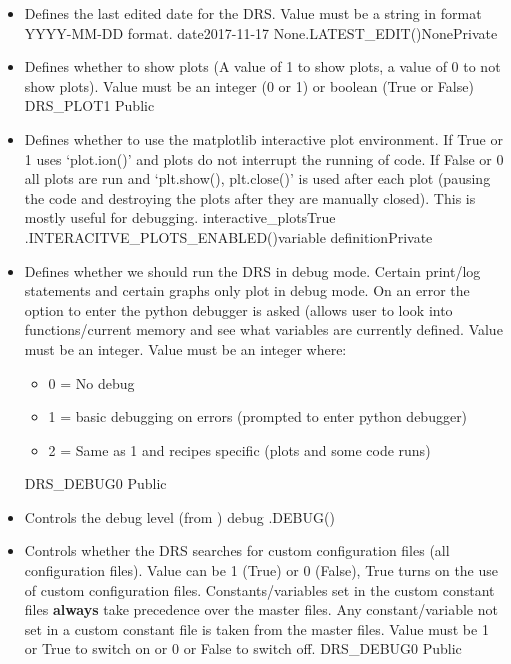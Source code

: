 \begin{itemize}
\ifdevguide
\item {}
{Defines the last edited date for the DRS. Value must be a string in format YYYY-MM-DD format.}
{date}{2017-11-17}
{None}{\spirouConst.LATEST\_EDIT()}{None}{Private}
\fi


\item {} 
{Defines whether to show plots (A value of 1 to show plots, a value of 0 to not show plots). Value must be an integer (0 or 1) or boolean (True or False)}
{DRS\_PLOT}{1}
{\AllRecipes}{\configtxtfile}{\AllRecipes}{Public}

\ifdevguide
\item {}
{Defines whether to use the matplotlib interactive plot environment. If True or 1 uses `plot.ion()' and plots do not interrupt the running of code. If False or 0 all plots are run and `plt.show(), plt.close()' is used after each plot (pausing the code and destroying the plots after they are manually closed). This is mostly useful for debugging.}
{interactive\_plots}{True}
{\spirouPlot}{\spirouConst.INTERACITVE\_PLOTS\_ENABLED()}{\spirouPlot variable definition}{Private}
\fi

\item {} 
{Defines whether we should run the DRS in debug mode. Certain print/log statements and certain graphs only plot in debug mode. On an error the option to enter the python debugger is asked (allows user to look into functions/current memory and see what variables are currently defined. Value must be an integer. Value must be an integer where:
\begin{itemize}
\item 0 = No debug
\item 1 = basic debugging on errors (prompted to enter python debugger)
\item 2 = Same as 1 and recipes specific (plots and some code runs)
\end{itemize}
}
{DRS\_DEBUG}{0}
{\AllRecipes}{\configtxtfile}{\AllRecipes}{Public}

\ifdevguide
\item {}
{Controls the debug level (from )}
{debug}
{\AllRecipes}{\spirouConst.DEBUG()}{\AllRecipes}
\fi


\item {} 
{Controls whether the DRS searches for custom configuration files (all configuration files). Value can be 1 (True) or 0 (False), True turns on the use of custom configuration files. Constants/variables set in the custom constant files \textbf{always} take precedence over the master files. Any constant/variable not set in a custom constant file is taken from the master files. Value must be 1 or True to switch on or 0 or False to switch off.}
{DRS\_DEBUG}{0}
{\AllRecipes}{\configtxtfile}{\AllRecipes}{Public}


\end{itemize}
